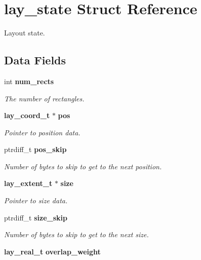 \section{lay\_\-state Struct Reference}
\label{structlay__state}
Layout state.  


\subsection*{Data Fields}
\begin{CompactItemize}
\item 
int {\bf num\_\-rects}\label{structlay__state_o0}

\begin{CompactList}\small\item\em The number of rectangles. \item\end{CompactList}\item 
{\bf lay\_\-coord\_\-t} $\ast$ {\bf pos}\label{structlay__state_o1}

\begin{CompactList}\small\item\em Pointer to position data. \item\end{CompactList}\item 
ptrdiff\_\-t {\bf pos\_\-skip}\label{structlay__state_o2}

\begin{CompactList}\small\item\em Number of bytes to skip to get to the next position. \item\end{CompactList}\item 
{\bf lay\_\-extent\_\-t} $\ast$ {\bf size}\label{structlay__state_o3}

\begin{CompactList}\small\item\em Pointer to size data. \item\end{CompactList}\item 
ptrdiff\_\-t {\bf size\_\-skip}\label{structlay__state_o4}

\begin{CompactList}\small\item\em Number of bytes to skip to get to the next size. \item\end{CompactList}\item 
{\bf lay\_\-real\_\-t} {\bf overlap\_\-weight}\label{structlay__state_o5}


\end{CompactItemize}
